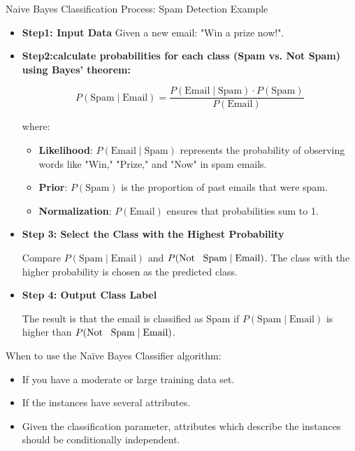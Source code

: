 	\begin{frame}{Naive Bayes Classification Process: Spam Detection Example}
	\begin{itemize}
		\item \textbf{Step1: Input Data}
	Given a new email: "Win a prize now!".
		\medskip
	\item \textbf{Step2:calculate probabilities for each class (Spam vs. Not Spam) using Bayes' theorem:}
	
	\[
	P(\text{Spam} \mid \text{Email}) = \frac{P(\text{Email} \mid \text{Spam}) \cdot P(\text{Spam})}{P(\text{Email})}
	\]
	
	where:
	
	\begin{itemize}
		\item \textbf{Likelihood}: \( P(\text{Email} \mid \text{Spam}) \) represents the probability of observing words like "Win," "Prize," and "Now" in spam emails.
		\item \textbf{Prior}: \( P(\text{Spam}) \) is the proportion of past emails that were spam.
		\item \textbf{Normalization}: \( P(\text{Email}) \) ensures that probabilities sum to 1.
	\end{itemize}
		\end{itemize}
\end{frame}
\begin{frame}
		\begin{itemize}
	\item \textbf{{Step 3: Select the Class with the Highest Probability}}
	
	Compare \( P(\text{Spam} \mid \text{Email}) \) and \( P(\text{Not \, Spam} \mid \text{Email}) \). The class with the higher probability is chosen as the predicted class.
		\medskip
	\item \textbf{{Step 4: Output Class Label}}
	
	The result is that the email is classified as Spam if \( P(\text{Spam} \mid \text{Email}) \) is higher than \( P(\text{Not \, Spam} \mid \text{Email}) \).
		\end{itemize}
\end{frame}


\begin{frame}{When to use the Naïve Bayes Classifier algorithm:}
	\begin{itemize}
		\item If you have a moderate or large training data set.
		\item If the instances have several attributes.
		\item Given the classification parameter, attributes which describe the instances should be conditionally independent.
	\end{itemize}
\end{frame}

